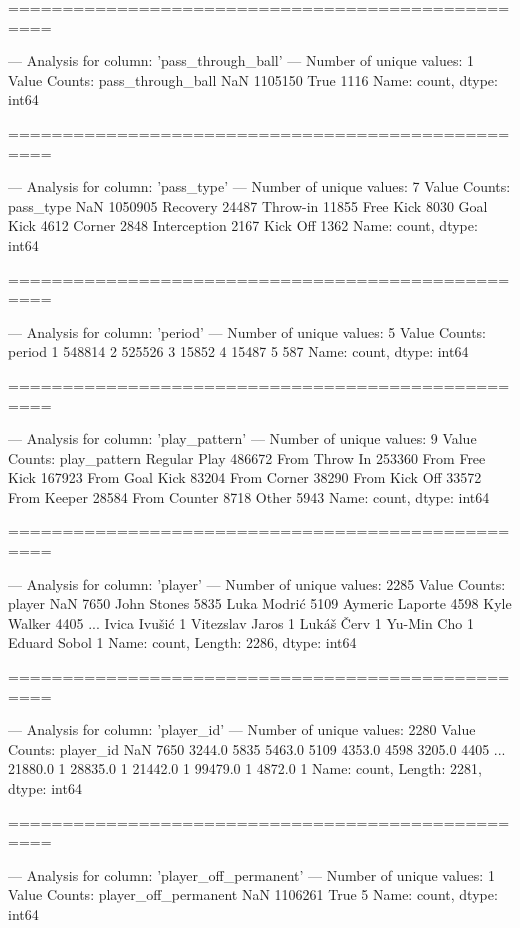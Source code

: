==================================================

--- Analysis for column: 'pass_through_ball' ---
Number of unique values: 1
Value Counts:
pass_through_ball
NaN     1105150
True       1116
Name: count, dtype: int64

==================================================

--- Analysis for column: 'pass_type' ---
Number of unique values: 7
Value Counts:
pass_type
NaN             1050905
Recovery          24487
Throw-in          11855
Free Kick          8030
Goal Kick          4612
Corner             2848
Interception       2167
Kick Off           1362
Name: count, dtype: int64

==================================================

--- Analysis for column: 'period' ---
Number of unique values: 5
Value Counts:
period
1    548814
2    525526
3     15852
4     15487
5       587
Name: count, dtype: int64

==================================================

--- Analysis for column: 'play_pattern' ---
Number of unique values: 9
Value Counts:
play_pattern
Regular Play      486672
From Throw In     253360
From Free Kick    167923
From Goal Kick     83204
From Corner        38290
From Kick Off      33572
From Keeper        28584
From Counter        8718
Other               5943
Name: count, dtype: int64

==================================================

--- Analysis for column: 'player' ---
Number of unique values: 2285
Value Counts:
player
NaN                7650
John Stones        5835
Luka Modrić        5109
Aymeric Laporte    4598
Kyle Walker        4405
                   ... 
Ivica Ivušić          1
Vitezslav Jaros       1
Lukáš Červ            1
Yu-Min Cho            1
Eduard Sobol          1
Name: count, Length: 2286, dtype: int64

==================================================

--- Analysis for column: 'player_id' ---
Number of unique values: 2280
Value Counts:
player_id
NaN        7650
3244.0     5835
5463.0     5109
4353.0     4598
3205.0     4405
           ... 
21880.0       1
28835.0       1
21442.0       1
99479.0       1
4872.0        1
Name: count, Length: 2281, dtype: int64

==================================================

--- Analysis for column: 'player_off_permanent' ---
Number of unique values: 1
Value Counts:
player_off_permanent
NaN     1106261
True          5
Name: count, dtype: int64

